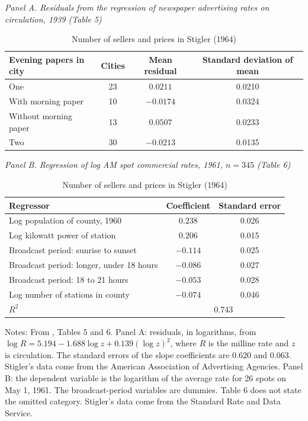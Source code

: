 \begin{table}[htbp]
\centering
\caption{Number of sellers and prices in Stigler (1964)}
\label{tab:02-stigler-t56}
\small
{\textit{Panel A. Residuals from the regression of newspaper advertising rates on circulation, 1939 (Table 5)}}\par\smallskip
\begin{tabular}{@{}lccc@{}}
\toprule
Evening papers in city & Cities & Mean residual & Standard deviation of mean \\
\midrule
One                          & 23 & $0.0211$  & 0.0210 \\
\quad With morning paper     & 10 & $-0.0174$ & 0.0324 \\
\quad Without morning paper  & 13 & $0.0507$  & 0.0233 \\
Two                          & 30 & $-0.0213$ & 0.0135 \\
\bottomrule
\end{tabular}

\medskip
{\textit{Panel B. Regression of log AM spot commercial rates, 1961, $n = 345$ (Table 6)}}\par\smallskip
\begin{tabular}{@{}lcc@{}}
\toprule
Regressor & Coefficient & Standard error \\
\midrule
Log population of county, 1960              & $0.238$  & 0.026 \\
Log kilowatt power of station               & $0.206$  & 0.015 \\
Broadcast period: sunrise to sunset         & $-0.114$ & 0.025 \\
Broadcast period: longer, under 18 hours    & $-0.086$ & 0.027 \\
Broadcast period: 18 to 21 hours            & $-0.053$ & 0.028 \\
Log number of stations in county            & $-0.074$ & 0.046 \\
\midrule
$R^2$ & \multicolumn{2}{c}{0.743} \\
\bottomrule
\end{tabular}

\medskip
\begin{minipage}{0.94\linewidth}
\footnotesize
Notes: From \citet{Stigler1964}, Tables 5 and 6. Panel A: residuals, in logarithms, from
$\log R = 5.194 - 1.688\log z + 0.139(\log z)^2$, where $R$ is the milline rate and $z$ is circulation. The standard
errors of the slope coefficients are 0.620 and 0.063. Stigler's data come from the American Association of
Advertising Agencies. Panel B: the dependent variable is the logarithm of the average rate for 26 spots on May 1, 1961. The
broadcast-period variables are dummies. Table 6 does not state the omitted category. Stigler's data come from
the Standard Rate and Data Service.
\end{minipage}
\end{table}

